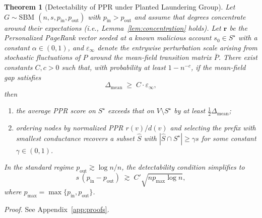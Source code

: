 \documentclass[11pt,english]{article}
\newtheorem{theorem}{Theorem}[section]
\begin{document}
\begin{theorem}[Detectability of PPR under Planted Laundering Group]
\label{thm:detectability}
Let $G\sim\mathrm{SBM}$ $(n,s,p_{\mathrm{in}},p_{\mathrm{out}})$ with $p_{\mathrm{in}}>p_{\mathrm{out}}$ and assume that degrees concentrate around their expectations (i.e., Lemma~\ref{lem:concentration} holds). Let $\mathbf{r}$ be the Personalized PageRank vector seeded at a known malicious account $s_0\in S^\star$ with a constant $\alpha\in(0,1)$, and $\varepsilon_{\infty}$ denote the entrywise perturbation scale arising from stochastic fluctuations of $P$ around the mean-field transition matrix $\bar P$. There exist constants $C,c>0$ such that, with probability at least $1-n^{-c}$, if the mean-field gap satisfies
\[
\Delta_{\mathrm{mean}} \;\ge\; C\cdot\varepsilon_{\infty},
\]
then 
\begin{enumerate}
    \item the average PPR score on $S^\star$ exceeds that on $V\setminus S^\star$ by at least $\tfrac{1}{2}\Delta_{\mathrm{mean}}$;
    \item ordering nodes by normalized PPR $r(v)/d(v)$ and selecting the prefix with smallest conductance recovers a subset $\widehat S$ with $|\widehat S\cap S^\star|\ge\gamma s$ for some constant $\gamma\in(0,1)$.
\end{enumerate}
In the standard regime $p_{\mathrm{out}}\gtrsim \log n/n$, the detectability condition simplifies to
\[
s\,(p_{\mathrm{in}}-p_{\mathrm{out}}) \;\gtrsim\; C'\sqrt{n p_{\max}\log n},
\]
where $p_{\max}=\max\{p_{\mathrm{in}},p_{\mathrm{out}}\}$. 
\end{theorem}

\vspace{0.5em}
\noindent\textit{Proof.}
See Appendix~\ref{app:proofs}.
\end{document}
